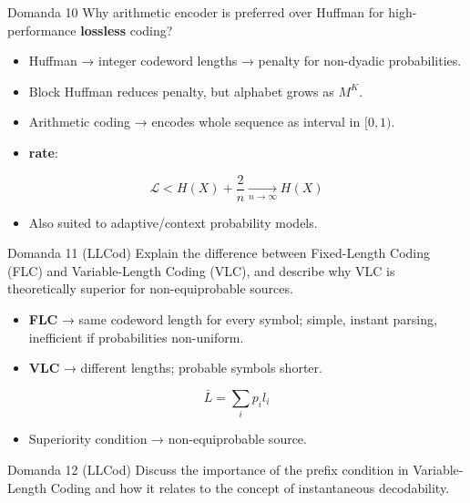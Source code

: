 \begin{questionbox}{Domanda 10}
Why arithmetic encoder is preferred over Huffman for high-performance \textbf{lossless} coding?
\end{questionbox}


\begin{itemize}
  \item Huffman → integer codeword lengths → penalty for non-dyadic probabilities.
  \item Block Huffman reduces penalty, but alphabet grows as $M^K$.
  \item Arithmetic coding → encodes whole sequence as interval in $[0,1)$.
  \item \textbf{rate}:
\end{itemize}


$$
\mathcal{L} < H(X) + \frac{2}{n}
\xrightarrow[n\to\infty]{}
H(X)
$$


\begin{itemize}
  \item Also suited to adaptive/context probability models.
\end{itemize}



\begin{questionbox}{Domanda 11}
(LLCod) Explain the difference between Fixed-Length Coding (FLC) and Variable-Length Coding (VLC), and describe why VLC is theoretically superior for non-equiprobable sources.
\end{questionbox}


\begin{itemize}
  \item \textbf{FLC} → same codeword length for every symbol; simple, instant parsing, inefficient if probabilities non-uniform.
  \item \textbf{VLC} → different lengths; probable symbols shorter.
\end{itemize}


$$
\bar{L} = \sum_i p_i l_i
$$


\begin{itemize}
  \item Superiority condition → non-equiprobable source.
\end{itemize}



\begin{questionbox}{Domanda 12}
(LLCod) Discuss the importance of the prefix condition in Variable-Length Coding and how it relates to the concept of instantaneous decodability.
\end{questionbox}


